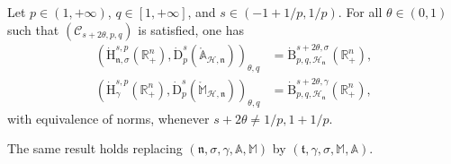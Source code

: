 \documentclass[10pt]{amsart}
\theoremstyle{definition}\newtheorem{defi}[theo]{Definition}\newtheorem{rema}[theo]{Remark}\newtheorem{exam}[theo]{Example}\newtheorem{exem}[theo]{Example}\newtheorem{nota}[theo]{Notation}
\newcommand{\bbA}{\mathbb{A}}
\newcommand{\bbR}{\mathbb{R}}
\newcommand{\bbM}{\mathbb{M}}
\newcommand{\rmH}{\mathrm{H}}%
\newcommand{\rmB}{\mathrm{B}}
\newcommand{\rmD}{\mathrm{D}}
\newcommand{\clH}{\mathcal{H}}
\newcommand{\clC}{\mathcal{C}}
\newcommand{\fkn}{\mathfrak{n}}
\newcommand{\fkt}{\mathfrak{t}}
\begin{document}
\begin{prop}\label{prop:InterpHomDomainHodgeMaxwellStokes}
Let $p\in(1,+\infty)$, $q\in[1,+\infty]$, and $s\in(-1+1/p,1/p)$. For all $\theta\in(0,1)$ such that $(\clC_{s+2\theta,p,q})$ is satisfied, one has
\begin{align}
\left(\dot{\rmH}^{s,p}_{{\fkn},\sigma}\left(\bbR^n_+\right),\dot{\rmD}^{s}_{p}\left(\mathring{\bbA}_{\clH,\fkn}\right)\right)_{\theta,q} &= \dot{\rmB}^{s+2\theta,\sigma}_{p,q,\clH_{\fkn}}\left(\bbR^n_+\right),\label{eq:1stInterpolSolenoidal}
\\
\left(\dot{\rmH}^{s,p}_{\gamma}\left(\bbR^n_+\right),\dot{\rmD}^{s}_{p}\left(\mathring{\bbM}_{\clH,\fkn}\right)\right)_{\theta,q} &= \dot{\rmB}^{s+2\theta,\gamma}_{p,q,\clH_{\fkn}}\left(\bbR^n_+\right),\label{eq:2ndInterpolSolenoidal}
\end{align}
with equivalence of norms, whenever $s+2\theta\neq 1/p,1+1/p$.

The same result holds replacing $(\fkn,\sigma,\gamma,\bbA,\bbM)$ by $(\fkt,\gamma,\sigma,\bbM,\bbA)$.
\end{prop}
\end{document}
